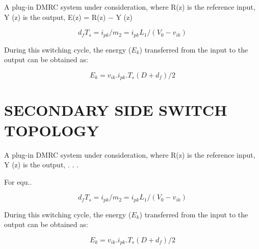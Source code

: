 A plug-in DMRC system under consideration,
where R(z) is the reference input, Y (z) is the output, E(z) =
R(z) − Y (z) 

\begin{equation}
d_fT_s=i_{pk}/m_2=i_{pk}L_1/(V_0-v_{ik})
\end{equation}

During this switching cycle, the energy ($E_k$) transferred
from the input to the output can be obtained as:

\begin{equation}
E_k=v_{ik}.i_{pk}.T_s(D+d_f)/2
\end{equation}


\section{SECONDARY SIDE SWITCH TOPOLOGY}

A plug-in DMRC system under consideration,
where R(z) is the reference input, Y (z) is the output, . . .

For equ..

\begin{equation}
d_fT_s=i_{pk}/m_2=i_{pk}L_1/(V_0-v_{ik})
\end{equation}

During this switching cycle, the energy ($E_k$) transferred
from the input to the output can be obtained as:

\begin{equation}
E_k=v_{ik}.i_{pk}.T_s(D+d_f)/2
\end{equation}


